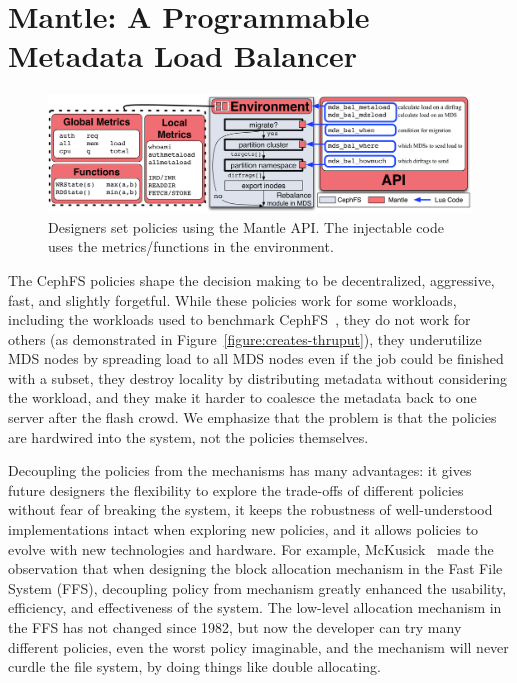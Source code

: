 \section{Mantle: A Programmable Metadata Load Balancer}
\label{mantle-implementation}							%
\begin{figure}
	\centering
	\includegraphics[width=1\textwidth]{./chapters/mantle/figures/balancer-api.pdf} 
	\caption{Designers set policies using the Mantle API. The injectable code uses the metrics/functions in the environment. \label{figure:balancer-api}}  
\end{figure}

The CephFS policies shape the decision making to be decentralized, aggressive, fast, and slightly forgetful. While these policies work for some workloads, including the workloads used to benchmark CephFS~\cite{weil:sc2004-dyn-metadata}, they do not work for others (as demonstrated in Figure~\ref{figure:creates-thruput}), they underutilize MDS nodes by spreading load to all MDS nodes even if the job could be finished with a subset, they destroy locality by distributing metadata without considering the workload, and they make it harder to coalesce the metadata back to one server after the flash crowd. We emphasize that the problem is that the policies are hardwired into the system, not the policies themselves. 

Decoupling the policies from the mechanisms has many advantages: it gives future designers the flexibility to explore the trade-offs of different policies without fear of breaking the system, it keeps the robustness of well-understood implementations intact when exploring new policies, and it allows policies to evolve with new technologies and hardware. For example, McKusick~\cite{mckusick:fast2015-FFS} made the observation that when designing the block allocation mechanism in the Fast File System (FFS), decoupling policy from mechanism greatly enhanced the usability, efficiency, and effectiveness of the system. The low-level allocation mechanism in the FFS has not changed since 1982, but now the developer can try many different policies, even the worst policy imaginable, and the mechanism will never curdle the file system, by doing things like double allocating. 

